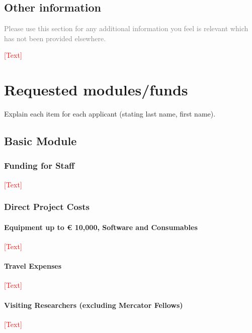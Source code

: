 \documentclass[a4paper,11pt]{article}
\begin{document}
\subsection{Other information}
\textcolor{gray}{Please use this section for any additional information you feel is relevant which has not been provided elsewhere.}

\noindent\textcolor{red}{[Text]}



\section{Requested modules/funds}
Explain each item for each applicant (stating last name, first name).

\subsection{Basic Module}

\subsubsection{Funding for Staff}

\noindent\textcolor{red}{[Text]}

\subsubsection{Direct Project Costs}

\paragraph{Equipment up to € 10,000, Software and Consumables}

\noindent\textcolor{red}{[Text]}

\paragraph{Travel Expenses}

\noindent\textcolor{red}{[Text]}

\paragraph{Visiting Researchers (excluding Mercator Fellows)}

\noindent\textcolor{red}{[Text]}

\end{document}
